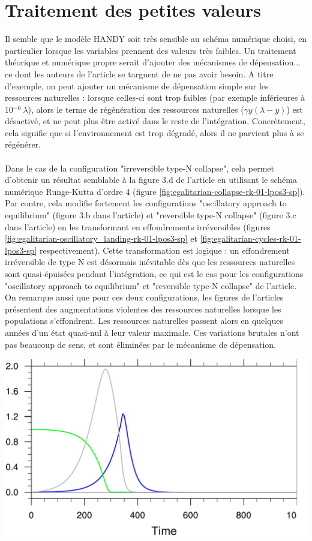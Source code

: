 \documentclass[12pt]{scrartcl}
\begin{document}
\section{Traitement des petites valeurs}
Il semble que le modèle HANDY soit très sensible au schéma numérique choisi, en particulier lorsque les variables prennent des valeurs très faibles. Un traitement théorique et numérique propre serait d'ajouter des mécanismes de dépensation... ce dont les auteurs de l'article se targuent de ne pas avoir besoin. A titre d'exemple, on peut ajouter un mécanisme de dépensation simple sur les ressources naturelles : lorsque celles-ci sont trop faibles (par exemple inférieures à 10$^{-6} \ \lambda$), alors le terme de régénération des ressources naturelles ($\gamma y (\lambda-y)$) est désactivé, et ne peut plus être activé dans le reste de l'intégration. Concrètement, cela signifie que si l'environnement est trop dégradé, alors il ne parvient plus à se régénérer.\\
$  $\\
Dans le cas de la configuration "irreversible type-N collapse", cela permet d'obtenir un résultat semblable à la figure 3.d de l'article en utilisant le schéma numérique Runge-Kutta d'ordre 4 (figure \ref{fig:egalitarian-collapse-rk-01-lpos3-sp}). Par contre, cela modifie fortement les configurations "oscillatory approach to equilibrium" (figure 3.b dans l'article) et "reversible type-N collapse" (figure 3.c dans l'article) en les transformant en effondrements irréversibles (figures \ref{fig:egalitarian-oscillatory_landing-rk-01-lpos3-sp} et \ref{fig:egalitarian-cycles-rk-01-lpos3-sp} respectivement). Cette transformation est logique : un effondrement irréversible de type N est désormais inévitable dès que les ressources naturelles sont quasi-épuisées pendant l'intégration, ce qui est le cas pour les configurations "oscillatory approach to equilibrium" et "reversible type-N collapse" de l'article. On remarque aussi que pour ces deux configurations, les figures de l'articles présentent des augmentations violentes des ressources naturelles lorsque les populations s'effondrent. Les ressources naturelles passent alors en quelques années d'un état quasi-nul à leur valeur maximale. Ces variations brutales n'ont pas beaucoup de sens, et sont éliminées par le mécanisme de dépensation.

\begin{center}
\includegraphics[width=0.7\linewidth]{../ncl/egalitarian-collapse-rk-01-lpos3-sp.pdf}
\end{center}
\end{document}
